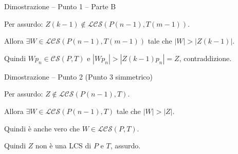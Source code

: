 \begin{frame}{Dimostrazione -- Punto 1 -- Parte B}


\BIL
\item Per assurdo: \alert{$Z(k-1) \not\in \mathcal{LCS}( P(n-1), T(m-1) )$}. 
\item  Allora $\exists W \in \mathcal{LCS}( P(n-1), T(m-1))$ tale che $|W| > |Z(k-1)|$.
\item Quindi $Wp_n \in \mathcal{CS}(P,T)$ e $|Wp_n| > |Z(k-1)p_n| = Z$, contraddizione.
\EIL


\end{frame}


\begin{frame}{Dimostrazione -- Punto 2 (Punto 3 simmetrico)}


\BIL
\item Per assurdo: \alert{$Z \not\in \mathcal{LCS}( P(n-1), T)$}.
\item Allora $\exists W \in \mathcal{LCS}( P(n-1), T)$ tale che $|W| > |Z|$.
\item Quindi è anche vero che $W \in \mathcal{LCS}(P,T)$.
\item Quindi $Z$ non è una LCS di $P$ e $T$, assurdo.
\EIL


\end{frame}

